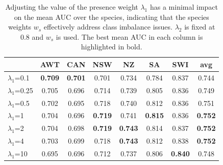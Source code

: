 \begin{table}[h]
\centering
\caption{Adjusting the value of the presence weight $\lambda_1$ has a minimal impact on the mean AUC over the species,  indicating that the species weights $w_s$ effectively address class imbalance issues. $\lambda_2$ is fixed at $0.8$ and $w_s$ is used. The best mean AUC in each column is highlighted in bold.}

\setlength{\tabcolsep}{0.46\tabcolsep}  %
\renewcommand{\arraystretch}{1.2} %
\begin{tabular}{l|cccccc|c}
                            & AWT   & CAN   & NSW   & NZ    & SA    & SWI   & avg   \\ \hline \hline
$\lambda_1 $=0.1            & \textbf{0.709} & \textbf{0.701} & 0.701 & 0.734 & 0.784 & 0.837 & 0.744 \\
$\lambda_1 $=0.25           & 0.705 & 0.696 & 0.714 & 0.739 & 0.805 & 0.836 & 0.749 \\
$\lambda_1 $=0.5            & 0.702 & 0.695 & 0.718 & 0.740 & 0.812 & 0.836 & 0.751 \\
$\lambda_1 $=1              & 0.704 & 0.696 & \textbf{0.719} & 0.741 & \textbf{0.815} & 0.836 & \textbf{0.752} \\
$\lambda_1 $=2              & 0.704 & 0.698 & \textbf{0.719} & \textbf{0.743} & 0.814 & 0.837 & \textbf{0.752} \\
$\lambda_1 $=4              & 0.703 & 0.699 & 0.718 & \textbf{0.743} & 0.812 & 0.838 & \textbf{0.752} \\
$\lambda_1 $=10             & 0.695 & 0.696 & 0.712 & 0.737 & 0.806 & \textbf{0.840} & 0.748 \\
 \hline
\end{tabular}

\label{tab:lambda1}
\end{table}